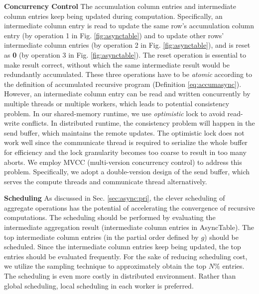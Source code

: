 \documentclass{vldb}
\begin{document}
\noindent\textbf{Concurrency Control}
The accumulation column entries and intermediate column entries keep being updated during computation. Specifically, an intermediate column entry is read to update the same row's accumulation column entry (by operation 1 in Fig. \ref{fig:asynctable}) and to update other rows' intermediate column entries (by operation 2 in Fig. \ref{fig:asynctable}), and is reset as \textbf{0} (by operation 3 in Fig. \ref{fig:asynctable}). The reset operation is essential to make result correct, without which the same intermediate result would be redundantly accumulated. These three operations have to be \emph{atomic} according to the definition of accumulated recursive program (Definition \ref{eq:accumasync}). However, an intermediate column entry can be read and written concurrently by multiple threads or multiple workers, which leads to potential consistency problem. In our shared-memory runtime, we use \emph{optimistic} lock to avoid read-write conflicts. In distributed runtime, the consistency problem will happen in the send buffer, which maintains the remote updates. The optimistic lock does not work well since the communicate thread is required to serialize the whole buffer for efficiency and the lock granularity becomes too coarse to result in too many aborts. We employ MVCC (multi-version concurrency control) to address this problem. Specifically, we adopt a double-version design of the send buffer, which serves the compute threads and communicate thread alternatively.


\noindent\textbf{Scheduling}
As discussed in Sec. \ref{sec:async:pri}, the clever scheduling of aggregate operations has the potential of accelerating the convergence of recursive computations. The scheduling should be performed by evaluating the intermediate aggregation result (intermediate column entries in AsyncTable). The top intermediate column entries (in the partial order defined by $g$) should be scheduled. Since the intermediate column entries keep being updated, the top entries should be evaluated frequently. For the sake of reducing scheduling cost, we utilize the sampling technique \cite{Zhang:2011:PDF:2038916.2038929} to approximately obtain the top $N\%$ entries. The scheduling is even more costly in distributed environment. Rather than global scheduling, local scheduling in each worker is preferred.
\end{document}
